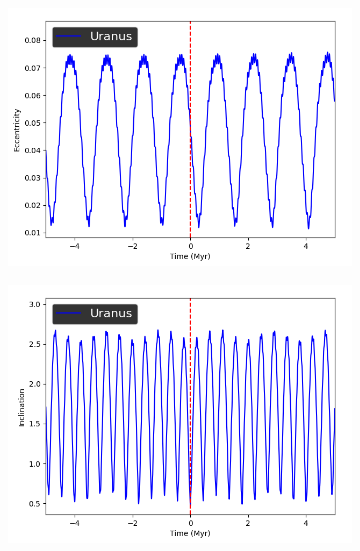 \documentclass[11pt, oneside]{article}   	%
\begin{document}
\begin{figure}[!h]
	\ContinuedFloat
    \centering
    \begin{subfigure}[t]{0.49\textwidth}
    \captionsetup{width=0.9\textwidth}
	\centering
       	 \includegraphics[width=\textwidth]{Eccentricity_Uranus}
    \end{subfigure}
    \begin{subfigure}[t]{0.49\textwidth}
    \captionsetup{width=0.9\textwidth}
        	\centering
	\includegraphics[width=\textwidth]{Inclination_Uranus}
    \end{subfigure}
\end{figure}
\end{document}
